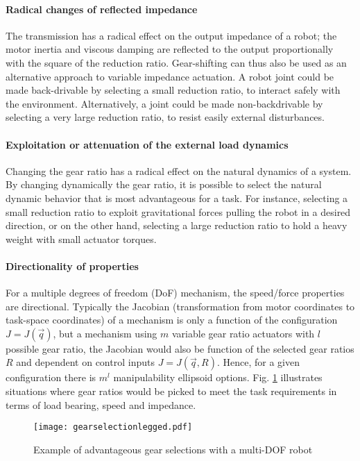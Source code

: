 \paragraph{Radical changes of reflected impedance}
The transmission has a radical effect on the output impedance of a robot; the motor inertia and viscous damping are reflected to the output proportionally with the square of the reduction ratio. Gear-shifting can thus also be used as an alternative approach to variable impedance actuation. A robot joint could be made back-drivable by selecting a small reduction ratio, to interact safely with the environment.  Alternatively, a joint could be made non-backdrivable by selecting a very large reduction ratio, to resist easily external disturbances.

\paragraph{Exploitation or attenuation of the external load dynamics}
Changing the gear ratio has a radical effect on the natural dynamics of a system. By changing dynamically the gear ratio, it is possible to select the natural dynamic behavior that is most advantageous for a task. For instance, selecting a small reduction ratio to exploit gravitational forces pulling the robot in a desired direction, or on the other hand, selecting a large reduction ratio to hold a heavy weight with small actuator torques.

\paragraph{Directionality of properties}
For a multiple degrees of freedom (DoF) mechanism, the speed/force properties are directional. Typically the Jacobian (transformation from motor coordinates to task-space coordinates) of a mechanism is only a function of the configuration $J=J(\vec{q})$, but a mechanism using $m$ variable gear ratio actuators with $l$ possible gear ratio, the Jacobian would also be function of the selected gear ratios $R$ and dependent on control inputs $J=J(\vec{q},R)$. Hence, for a given configuration there is $m^l$ manipulability ellipsoid options. Fig. \ref{fig:gearselectionlegged} illustrates situations where gear ratios would be picked to meet the task requirements in terms of load bearing, speed and impedance. 


\begin{figure}[hb]
	\centering
		\texttt{[image: gearselectionlegged.pdf]}
	\caption{Example of advantageous gear selections with a multi-DOF robot}
	\label{fig:gearselectionlegged}
\end{figure}

